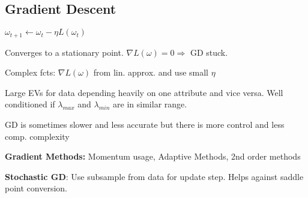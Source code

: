 \subsection{Gradient Descent}

$\omega_{t+1} \leftarrow \omega_t - \eta L(\omega_t)$

Converges to a stationary point. $\nabla L(\omega) = 0 \Rightarrow$ GD stuck.

Complex fcts: $\nabla L(\omega)$ from lin. approx. and use small $\eta$

Large EVs for data depending heavily on one attribute and vice versa. Well conditioned if $\lambda_{max}$ and $\lambda_{min}$ are in similar range.

GD is sometimes slower and less accurate but there is more control and less comp. complexity

\textbf{Gradient Methods:} Momentum usage, Adaptive Methods, 2nd order methods

\textbf{Stochastic GD}: Use subsample from data for update step. Helps against saddle point conversion.


